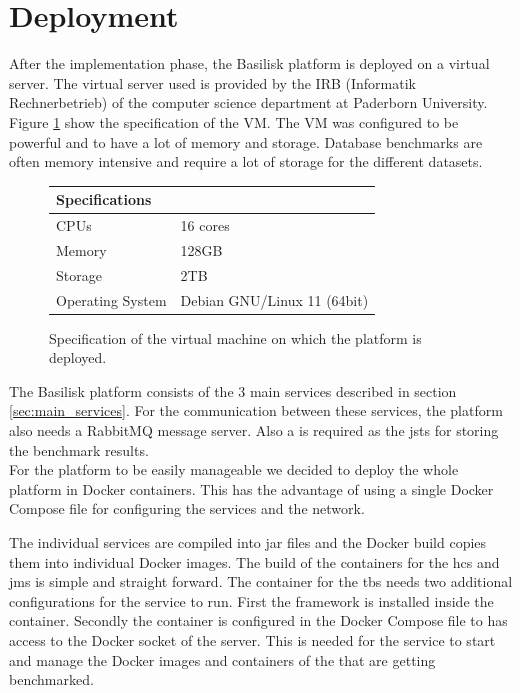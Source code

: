 \section{Deployment}
\label{sec:deployment}
After the implementation phase, the Basilisk platform is deployed on a virtual server.
The virtual server used is provided by the IRB (Informatik Rechnerbetrieb) of the computer science department at Paderborn University.
Figure \ref{fig:vm_specs} show the specification of the VM.
The VM was configured to be powerful and to have a lot of memory and storage.
Database benchmarks are often memory intensive and require a lot of storage for the different datasets.

\begin{figure}[tbph]
	\centering
	\begin{tabular}{ll}
		\toprule
		\textbf{Specifications} &                             \\ \midrule
		CPUs                    & 16 cores                    \\ \midrule
		Memory                  & 128GB                       \\ \midrule
		Storage                 & 2TB                         \\ \midrule
		Operating System        & Debian GNU/Linux 11 (64bit) \\ \bottomrule
	\end{tabular}
	\caption{Specification of the virtual machine on which the platform is deployed.}
	\label{fig:vm_specs}
\end{figure}

The Basilisk platform consists of the 3 main services described in section \ref{sec:main_services}.
For the communication between these services, the platform also needs a RabbitMQ message server.
Also a \ts{} is required as the \acl{jsts} for storing the benchmark results.
\\

For the platform to be easily manageable we decided to deploy the whole platform in Docker containers.
This has the advantage of using a single Docker Compose file for configuring the services and the network.

The individual services are compiled into jar files and the Docker build copies them into individual Docker images.
The build of the containers for the \ac{hcs} and \ac{jms} is simple and straight forward.
The container for the \ac{tbs} needs two additional configurations for the service to run.
First the \iguana{} framework is installed inside the container.
Secondly the container is configured in the Docker Compose file to has access to the Docker socket of the server.
This is needed for the service to start and manage the Docker images and containers of the \tsp{} that are getting benchmarked.


